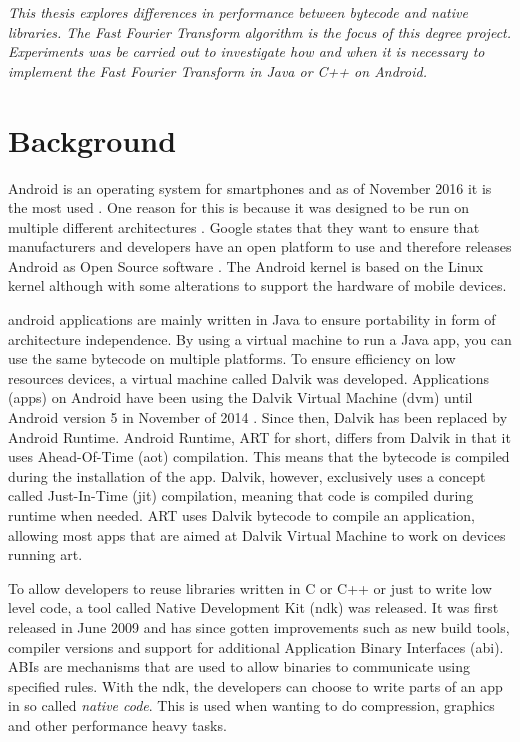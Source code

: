 
\textit{This thesis explores differences in performance between bytecode and native libraries. The Fast Fourier Transform algorithm is the focus of this degree project. Experiments was be carried out to investigate how and when it is necessary to implement the Fast Fourier Transform in Java or C++ on Android.}

\section{Background}
Android is an operating system for smartphones and as of November 2016 it is the most used \cite{android:os:popularity}. One reason for this is because it was designed to be run on multiple different architectures \cite{android:os:devices}. Google states that they want to ensure that manufacturers and developers have an open platform to use and therefore releases Android as Open Source software \cite{android:os:opensource}. The Android kernel is based on the Linux kernel although with some alterations to support the hardware of mobile devices.

\gls{android} applications are mainly written in Java to ensure portability in form of architecture independence. By using a virtual machine to run a Java app, you can use the same bytecode on multiple platforms. To ensure efficiency on low resources devices, a virtual machine called Dalvik was developed. Applications (apps) on Android have been using the Dalvik Virtual Machine (\gls{dvm}) until Android version 5 \cite{android:dalvik} in November of 2014 \cite{android:dalvik:release}. Since then, Dalvik has been replaced by Android Runtime. Android Runtime, ART for short, differs from Dalvik in that it uses Ahead-Of-Time (\gls{aot}) compilation. This means that the bytecode is compiled during the installation of the app. Dalvik, however, exclusively uses a concept called Just-In-Time (\gls{jit}) compilation, meaning that code is compiled during runtime when needed. ART uses Dalvik bytecode to compile an application, allowing most \gls{apps} that are aimed at Dalvik Virtual Machine to work on devices running \gls{art}.

To allow developers to reuse libraries written in C or C++ or just to write low level code, a tool called Native Development Kit (\gls{ndk}) was released. It was first released in June 2009 \cite{Lin2011} and has since gotten improvements such as new build tools, compiler versions and support for additional Application Binary Interfaces (\gls{abi}). ABIs are mechanisms that are used to allow binaries to communicate using specified rules. With the \gls{ndk}, the developers can choose to write parts of an app in so called \emph{native code}. This is used when wanting to do compression, graphics and other performance heavy tasks.


